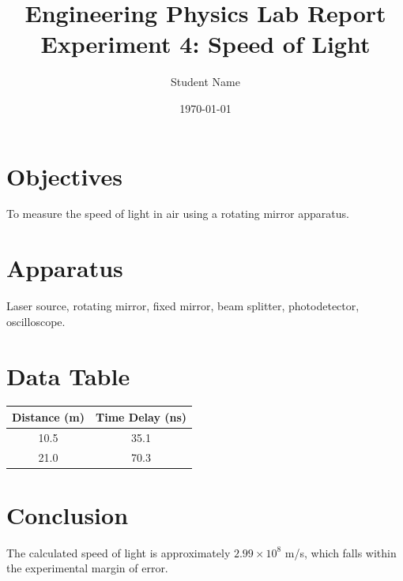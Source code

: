 \documentclass[11pt,a4paper]{article}
\title{\bfseries Engineering Physics Lab Report\\Experiment 4: Speed of Light}
\author{Student Name}
\date{\today}
\begin{document}
\maketitle

\section{Objectives}
To measure the speed of light in air using a rotating mirror apparatus.

\section{Apparatus}
Laser source, rotating mirror, fixed mirror, beam splitter, photodetector, oscilloscope.

\section{Data Table}
\begin{table}[h]
    \centering
    \begin{tabular}{cc}
        \toprule
        Distance (m) & Time Delay (ns) \\
        \midrule
        10.5 & 35.1 \\
        21.0 & 70.3 \\
        \bottomrule
    \end{tabular}
\end{table}

\section{Conclusion}
The calculated speed of light is approximately $2.99 \times 10^8$ m/s, which falls within the experimental margin of error.
\end{document}
